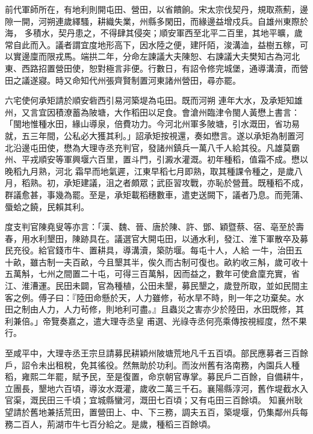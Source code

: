 
\begin{pinyinscope}

 前代軍師所在，有地利則開屯田、營田，以省饋餉。宋太宗伐契丹，規取燕薊，邊隙一開，河朔連歲繹騷，耕織失業，州縣多閑田，而緣邊益增戍兵。自雄州東際於海，
 多積水，契丹患之，不得肆其侵突；順安軍西至北平二百里，其地平曠，歲常自此而入。議者謂宜度地形高下，因水陸之便，建阡陌，浚溝洫，益樹五稼，可以實邊廩而限戎馬。端拱二年，分命左諫議大夫陳恕、右諫議大夫樊知古為河北東、西路招置營田使，恕對極言非便。行數日，有詔令修完城堡，通導溝瀆，而營田之議遂寢。時又命知代州張齊賢制置河東諸州營田，尋亦罷。



 六宅使何承矩請於順安砦西引易河築堤為屯田。既而河朔
 連年大水，及承矩知雄州，又言宜因積潦蓄為陂塘，大作稻田以足食。會滄州臨津令閩人黃懋上書言：「閩地惟種水田，緣山導泉，倍費功力。今河北州軍多陂塘，引水溉田，省功易就，五三年間，公私必大獲其利。」詔承矩按視還，奏如懋言。遂以承矩為制置河北沿邊屯田使，懋為大理寺丞充判官，發諸州鎮兵一萬八千人給其役。凡雄莫霸州、平戎順安等軍興堰六百里，置斗門，引澱水灌溉。初年種稻，值霜不成。懋以晚稻九月熟，河北
 霜早而地氣遲，江東早稻七月即熟，取其種課令種之，是歲八月，稻熟。初，承矩建議，沮之者頗眾；武臣習攻戰，亦恥於營葺。既種稻不成，群議愈甚，事幾為罷。至是，承矩載稻穗數車，遣吏送闕下，議者乃息。而莞蒲、蜃蛤之饒，民賴其利。



 度支判官陳堯叟等亦言：「漢、魏、晉、唐於陳、許、鄧、穎暨蔡、宿、亳至於壽春，用水利墾田，陳跡具在。議選官大開屯田，以通水利，發江、淮下軍散卒及募民充役。給官錢市牛、置耕具，導溝瀆，築防堰。每屯十人，人給
 一牛，治田五十畝，雖古制一夫百畝，今且墾其半，俟久而古制可復也。畝約收三斛，歲可收十五萬斛，七州之間置二十屯，可得三百萬斛，因而益之，數年可使倉廩充實，省江、淮漕運。民田未闢，官為種植，公田未墾，募民墾之，歲登所取，並如民間主客之例。傅子曰：『陸田命懸於天，人力雖修，茍水旱不時，則一年之功棄矣。水田之制由人力，人力茍修，則地利可盡。』且蟲災之害亦少於陸田，水田既修，其利兼倍。」帝覽奏嘉之，遣大理寺丞皇
 甫選、光祿寺丞何亮乘傳按視經度，然不果行。



 至咸平中，大理寺丞王宗旦請募民耕穎州陂塘荒地凡千五百頃。部民應募者三百餘戶，詔令未出租稅，免其徭役。然無助於功利。而汝州舊有洛南務，內園兵人種稻，雍熙二年罷，賦予民，至是復置，命京朝官專掌。募民戶二百餘，自備耕牛，立團長，墾地六百頃，導汝水溉灌，歲收二萬三千石。襄陽縣淳河，舊作堤截水入官渠，溉民田三千頃；宜城縣蠻河，溉田七百頃；又有屯田三百餘頃。
 知襄州耿望請於舊地兼括荒田，置營田上、中、下三務，調夫五百，築堤堰，仍集鄰州兵每務二百人，荊湖市牛七百分給之。是歲，種稻三百餘頃。




\end{pinyinscope}

